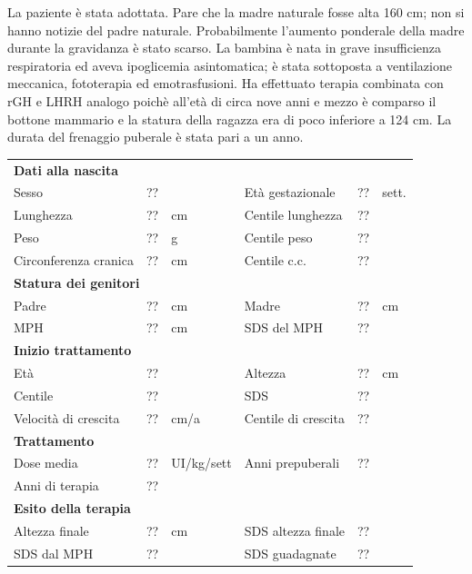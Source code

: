 
La paziente è stata adottata. Pare che la madre naturale fosse alta 160 cm; non si hanno notizie del padre naturale. Probabilmente l'aumento ponderale della madre durante la gravidanza è stato scarso. La bambina è nata in grave insufficienza respiratoria ed aveva ipoglicemia asintomatica; è stata sottoposta a ventilazione meccanica, fototerapia ed emotrasfusioni. Ha effettuato terapia combinata con rGH e LHRH analogo poichè all'età di circa nove anni e mezzo è comparso il bottone mammario e la statura della ragazza era di poco inferiore a 124 cm. La durata del frenaggio puberale è stata pari a un anno.

\begin{table}[!h]
\begin{tabular}{lrllrl}
\toprule
\multicolumn{6}{l}{\textbf{Dati alla nascita}}\\
Sesso 		& \multicolumn{2}{l}{??} 	& Età gestazionale 		& ?? 		& sett.\\
Lunghezza 	& ?? 		& cm 				& Centile lunghezza		& ?? 		\\
Peso 		& ?? 		& g					& Centile peso			& ?? 		\\
Circonferenza cranica	& ?? 		& cm 	& Centile c.c.			& ?? \\
\midrule
\multicolumn{6}{l}{\textbf{Statura dei genitori}}\\
Padre 		& ?? & cm 	& Madre 				& ?? & cm \\
MPH 		& ?? & cm 	& SDS del MPH 			& ??\\
\midrule
\multicolumn{6}{l}{\textbf{Inizio trattamento}} \\
Età	& ?? & 		& Altezza 				& ?? & cm  \\
Centile & ?? 	 &		& SDS		& ?? \\
Velocità di crescita & ?? & cm/a	& Centile di crescita & ??\\
\midrule
\multicolumn{6}{l}{\textbf{Trattamento}} \\
Dose media		& ?? & UI/kg/sett & Anni prepuberali & ??\\
Anni di terapia & ??\\
\midrule
\multicolumn{6}{l}{\textbf{Esito della terapia}} \\
Altezza finale			& ?? & cm 	& SDS altezza finale		& ??\\
SDS dal MPH				& ?? &		& SDS guadagnate 			& ??\\
\bottomrule
\end{tabular}
\end{table}
\clearpage


